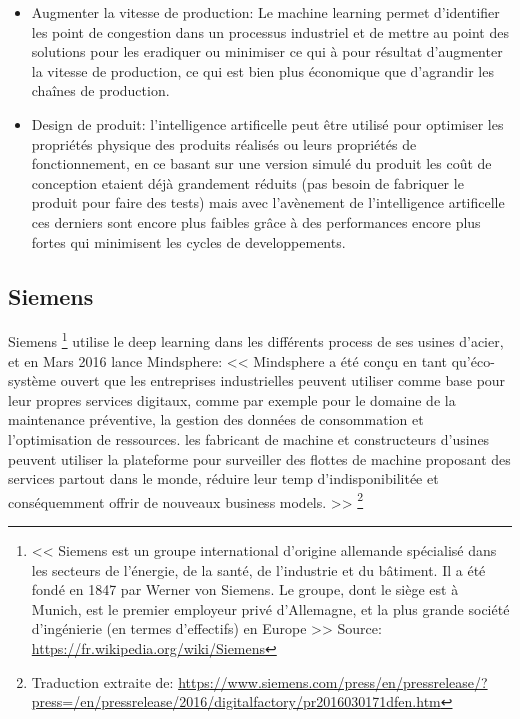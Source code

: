 \begin{itemize}
            \item Augmenter la vitesse de production: Le machine learning permet d'identifier les point 
            de congestion dans un processus industriel et de mettre au point des solutions pour les eradiquer 
            ou minimiser ce qui à pour résultat d'augmenter la vitesse de production, ce qui est bien 
            plus économique que d'agrandir les chaînes de production. \newline 

            \item Design de produit: l'intelligence artificelle peut être utilisé pour optimiser les propriétés 
            physique des produits réalisés ou leurs propriétés de fonctionnement, en ce basant sur une
            version simulé du produit les coût de conception etaient déjà grandement réduits 
            (pas besoin de fabriquer le produit pour faire des tests) mais avec l'avènement de 
            l'intelligence artificelle ces derniers sont encore plus faibles grâce à des performances
            encore plus fortes qui minimisent les cycles de developpements.
            \newline
        \end{itemize}

        \subsection*{Siemens}
            Siemens \footnote{<< Siemens est un groupe 
            international d’origine allemande spécialisé dans les secteurs de l'énergie, 
            de la santé, de l'industrie et du bâtiment. 
            Il a été fondé en 1847 par Werner von Siemens. 
            Le groupe, dont le siège est à Munich, est le premier employeur privé d'Allemagne, 
            et la plus grande société d'ingénierie (en termes d'effectifs) en Europe >> 
            Source: \url{https://fr.wikipedia.org/wiki/Siemens}}
            utilise le deep learning dans les différents process de ses usines d'acier,
            et en Mars 2016 lance Mindsphere: 
            << Mindsphere a été conçu en tant qu'éco-système ouvert que les entreprises industrielles
            peuvent utiliser comme base pour leur propres services digitaux, comme par exemple pour 
            le domaine de la maintenance préventive, la gestion des données de consommation et 
            l'optimisation de ressources. les fabricant de machine et constructeurs d'usines
            peuvent utiliser la plateforme pour surveiller des flottes de machine proposant des
            services partout dans le monde, réduire leur temp d'indisponibilitée et 
            conséquemment offrir de nouveaux business models. >> 
            \footnote{Traduction extraite de: \url{https://www.siemens.com/press/en/pressrelease/?press=/en/pressrelease/2016/digitalfactory/pr2016030171dfen.htm}}
            \newline


